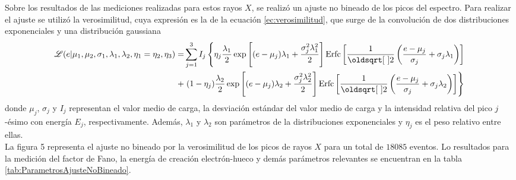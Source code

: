 Sobre los resultados de las mediciones realizadas para estos rayos $X$, se realizó un ajuste no bineado de los picos del espectro. Para realizar el ajuste se utilizó la verosimilitud, cuya expresión es la de la ecuación \eqref{ec:verosimilitud}, que surge de la convolución de dos distribuciones exponenciales y una distribución gaussiana
{\small
\begin{align}
    \Lagr(e|\mu_{1},
            \mu_{2},
            \sigma_{1},
            \lambda_{1},
            \lambda_{2},
            \eta_{1} = \eta_{2},
            \eta_{3})
    = &
    \sum\limits_{j=1}^{3} I_{j}
    \left\{
        \eta_{j}\frac{\lambda_{1}}{2}
        \exp
            \left[
                (e-\mu_{j})\lambda_{1} + \frac{\sigma_{j}^{2}\lambda_{1}^{2}}{2}
            \right]
        \mbox{Erfc}
        \left[
            \frac{1}{\sqrt{2}}
            \left(
                \frac{e - \mu_{j}}{\sigma_{j}}
                +\sigma_{j}\lambda_{1}
            \right)
        \right] \right. \nonumber
        \\
        + &
        \left.
        (1-\eta_{j})\frac{\lambda_{2}}{2}
        \exp
            \left[
                 (e - \mu_{j})\lambda_{2}
                 + \frac{\sigma_{j}^{2}\lambda_{2}^{2}}{2}
            \right]
        \mbox{Erfc}
        \left[
            \frac{1}{\sqrt{2}}
            \left(
                \frac{e - \mu_{j}}{\sigma_{j}}
                +\sigma_{j}\lambda_{2}
            \right)
        \right]
    \right\}
        \label{ec:verosimilitud}
\end{align}
}
donde $\mu_{j}$, $\sigma_{j}$ y $I_{j}$ representan el valor medio de carga, la desviación estándar del valor medio de carga y la intensidad relativa del pico $j$-ésimo con energía $E_{j}$, respectivamente. Además, $\lambda_{1}$ y $\lambda_{2}$ son parámetros de la distribuciones exponenciales y $\eta_{j}$ es el peso relativo entre ellas.\\
\indent La figura 5 representa el ajuste no bineado por la verosimilitud de los picos de rayos $X$ para un total de $18085$ eventos. Lo resultados para la medición del factor de Fano, la energía de creación electrón-hueco y demás parámetros relevantes se encuentran en la tabla \ref{tab:ParametrosAjusteNoBineado}.
